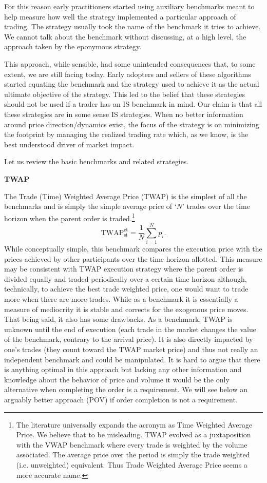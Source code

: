 For this reason early practitioners started using auxiliary benchmarks meant to help measure how well the strategy implemented a particular approach of trading. The strategy usually took the name of the benchmark it tries to achieve. We cannot talk about the benchmark without discussing, at a high level, the approach taken by the  eponymous strategy.


This approach, while sensible, had some unintended consequences that, to some extent, we are still facing today. Early adopters and sellers of these algorithms started equating the benchmark and the strategy used to achieve it as the actual ultimate objective of the strategy. This led to the belief that these strategies should not be used if a trader has an IS benchmark in mind. Our claim is that all these strategies are in some sense IS strategies. When no better information around price direction/dynamics exist, the focus of the strategy is on minimizing the footprint by managing the realized trading rate which, as we know, is the best understood driver of market impact.


Let us review the basic benchmarks and related strategies. \twomedskip


\noindent\textbf{TWAP} \twomedskip

The Trade (Time) Weighted Average Price (TWAP)  is the simplest of all the benchmarks and is simply the simple average price of `$N$' trades over the time horizon when the parent order is traded.\footnote{The literature universally  expands the acronym as Time Weighted Average Price. We believe that to be misleading. TWAP evolved as a juxtaposition with the VWAP benchmark where every trade is weighted by the volume associated. The average price over the period is simply the trade weighted (i.e. unweighted) equivalent. Thus Trade Weighted Average Price seems a more accurate name. }
        \begin{equation}
        \text{TWAP}_{\text{st}} ^{\text{et}}= \frac{1}{N}\sum_{i=1}^N{p_i}.
        \end{equation}
While conceptually simple, this benchmark compares the execution price with the prices achieved by other participants over the time horizon allotted. This measure may be consistent with TWAP execution strategy where the parent order is divided equally and traded periodically over a certain time horizon although, technically, to achieve the best trade weighted price, one would want to trade more when there are more trades. While  as a benchmark it is essentially a measure of mediocrity it is stable and corrects for the exogenous price moves. That being said, it also has some drawbacks. As a benchmark, TWAP is unknown until the end of execution (each trade in the market changes the value of the benchmark, contrary to the arrival price). It is also directly impacted by one's trades (they count toward the TWAP market price) and thus not really an independent benchmark and could be manipulated. 
It is hard to argue that there is anything optimal in this approach but lacking any other information and knowledge about the behavior of price and volume it would be the only alternative when completing the order is a requirement. We will see below an arguably better approach (POV) if order completion is not a requirement. 

